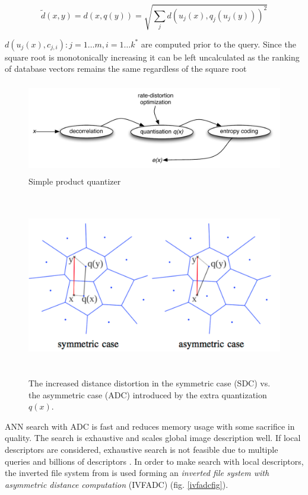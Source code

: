 \documentclass[english,12pt,a4paper,pdftex,elec,utf8]{aaltothesis}
\begin{document}
\begin{equation}
  \label{adceq}
  \tilde{d}(x,y)=d(x, q(y))=\sqrt{\sum_jd(u_j(x),q_j(u_j(y)))^2}
\end{equation}

$d(u_j(x),c_{j,i}) : j = 1\ldots m,i=1\ldots k^*$ are computed prior to the query. Since the square root is monotonically increasing it can be left uncalculated as the ranking of database vectors remains the same regardless of the square root\cite{Jegou2011}

\begin{figure}[htb]
\begin{center}
\includegraphics[height=4cm]{figures/pq}
\end{center}
\caption{Simple product quantizer \cite{Jegou2014}}
\label{pqfig}
\end{figure}

\begin{figure}[htb]
\begin{center}
\includegraphics[height=8cm]{figures/sdcadc}
\end{center}
\caption{The increased distance distortion in the symmetric case (SDC) vs. the asymmetric case (ADC) introduced by the extra quantization $q(x)$. \cite{Jegou2008}}
\label{nosdc}
\end{figure}

ANN search with ADC is fast and reduces memory usage with some sacrifice in quality. The search is exhaustive and scales global image description well. If local descriptors are considered, exhaustive search is not feasible due to multiple queries and billions of descriptors \cite{Jegou2008}. In order to make search with local descriptors, the inverted file system from \cite{Sivic2003} is used forming an \emph{inverted file system with asymmetric distance computation} (IVFADC) (fig. \ref{ivfadcfig}).
\end{document}
